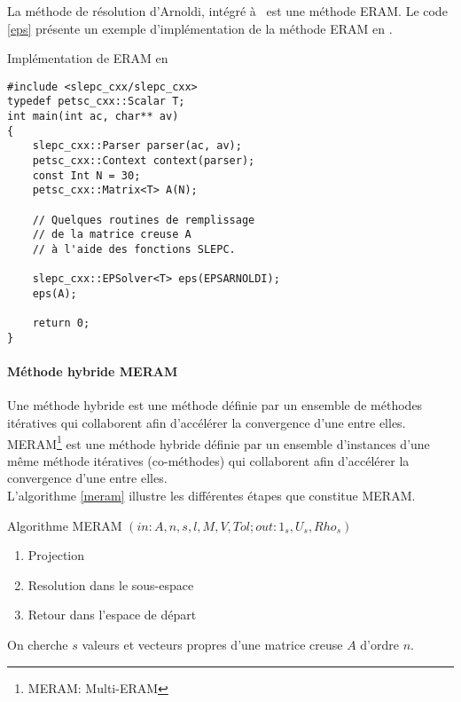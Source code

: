 La méthode de résolution d'Arnoldi, intégré à \slepc\, est une méthode ERAM. Le code \ref{eps} présente un exemple d'implémentation de la méthode ERAM en \slepcx.

\begin{algorithm}[h]
  \caption{Implémentation de ERAM en \slepcx}
  \label{eps}
\begin{verbatim}
#include <slepc_cxx/slepc_cxx>
typedef petsc_cxx::Scalar T;
int main(int ac, char** av)
{
    slepc_cxx::Parser parser(ac, av);
    petsc_cxx::Context context(parser);
    const Int N = 30;
    petsc_cxx::Matrix<T> A(N);

    // Quelques routines de remplissage
    // de la matrice creuse A
    // à l'aide des fonctions SLEPC.

    slepc_cxx::EPSolver<T> eps(EPSARNOLDI);
    eps(A);

    return 0;
}
\end{verbatim}
\end{algorithm}

\paragraph{Méthode hybride MERAM}

Une méthode hybride est une méthode définie par un ensemble de méthodes itératives qui collaborent afin d'accélérer la convergence d'une entre elles.\\

MERAM\footnote{MERAM: Multi-ERAM} est une méthode hybride définie par un ensemble d'instances d'une même méthode itératives (co-méthodes) qui collaborent afin d'accélérer la convergence d'une entre elles.\\

L'algorithme \ref{meram} illustre les différentes étapes que constitue MERAM.\\

\begin{algorithm}[h]
  \caption{Algorithme MERAM $(in:A,n,s,l,M,V,Tol;out: 1_s, U_s, Rho_s)$}
  \label{meram}
  \begin{enumerate}
  \item Projection
  \item Resolution dans le sous-espace
  \item Retour dans l'espace de départ
  \end{enumerate}
\end{algorithm}

On cherche $s$ valeurs et vecteurs propres d'une matrice creuse $A$ d'ordre $n$.

